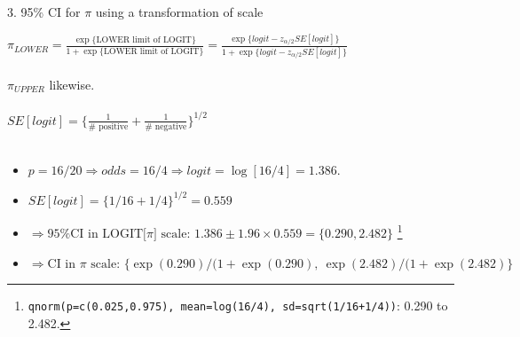 \documentclass[10pt]{beamer}\usepackage[]{graphicx}\usepackage[]{color}
\begin{document}
\begin{frame}{3. 95\% CI for $\pi$ using a transformation of scale}
	\small
	
	$\pi _{LOWER} = \frac{\exp \{\textrm{LOWER limit of LOGIT}\}}{1 + \exp \{\textrm{LOWER limit of LOGIT}\}} 
	=\frac{\exp \{logit - z_{\alpha/2}SE[logit]\}}{1 + \exp \{logit - z_{\alpha/2}SE[logit]\}} $ \\ \ \\
	
	$\pi _{UPPER}$ likewise.  \\ \ \\
	
	$SE[logit] = \big\{ \frac{1}{\# \textrm{ positive} }
	+ \frac{1}{\# \textrm{ negative} }
	\big\}^{1/2}$ \\ \ \\
	
	
	
	\begin{itemize}
		\item $p = 16/20 \Rightarrow odds = 16/4 \Rightarrow  logit = \log[16/4] = 1.386.$ 
		
		\item $SE[logit] =\{1/16 + 1/4 \}^{1/2} = 0.559$ 
		
		\item $  \Rightarrow \textrm{95\% CI in LOGIT[}\pi] \textrm{ scale: } 1.386 \pm 1.96\times 0.559
		= \{0.290, 2.482\}$ \footnote{  
			\texttt{qnorm(p=c(0.025,0.975), mean=log(16/4), sd=sqrt(1/16+1/4))}: 0.290 to 2.482.}
		
		\item $ \Rightarrow \textrm{CI in } \pi \textrm{ scale: }  \{ \exp(0.290)/(1+\exp(0.290), \
		\exp(2.482)/(1+\exp(2.482) \}$ 
	\end{itemize}
	
\end{frame}
\end{document}
